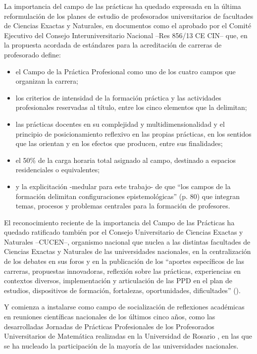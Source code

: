 \documentclass[oneside,spanish]{amsart}
\numberwithin{equation}{section}
\numberwithin{figure}{section}
\theoremstyle{definition}
\begin{document}
La importancia del campo de las prácticas ha quedado expresada en la última reformulación de los planes de estudio de profesorados universitarios de facultades de Ciencias Exactas y Naturales, en documentos como el aprobado por el Comité Ejecutivo del Consejo Interuniversitario Nacional --Res 856/13 CE CIN-- que, en la propuesta acordada de estándares para la acreditación de carreras de profesorado define: 
\begin{itemize}
	\item el Campo de la Práctica Profesional como uno de los cuatro campos que organizan la carrera;
	\item los criterios de intensidad de la formación práctica y las actividades profesionales reservadas al título, entre los cinco elementos que la delimitan;
	\item las prácticas docentes en su complejidad y multidimensionalidad y el principio de posicionamiento reflexivo en las propias prácticas, en los sentidos que las orientan y en los efectos que producen, entre sus finalidades;
	\item el 50\% de la carga horaria total asignado al campo, destinado a espacios residenciales o equivalentes;
	\item y la explicitación -medular para este trabajo- de que “los campos de la formación delimitan configuraciones epistemológicas” (p. 80) que integran temas, procesos y problemas centrales para la formación de profesores.
\end{itemize}

El reconocimiento reciente de la importancia del Campo de las Prácticas ha quedado ratificado también por el Consejo Universitario de Ciencias Exactas y Naturales --CUCEN--, organismo nacional que nuclea a las distintas facultades de Ciencias Exactas y Naturales de las universidades nacionales, en la centralización de los debates en sus foros y en la publicación de los “aportes específicos de las carreras, propuestas innovadoras, reflexión sobre las prácticas, experiencias en contextos diversos, implementación y articulación de las PPD  en el plan de estudios, dispositivos de formación, fortalezas, oportunidades, dificultades” (\cite{cucen18}).

Y comienza a instalarse como campo de socialización de reflexiones académicas en reuniones científicas nacionales de los últimos cinco años, como las desarrolladas Jornadas de Prácticas Profesionales de los Profesorados Universitarios de Matemática realizadas en la Universidad de Rosario , en las que se ha nucleado la participación de la mayoría de las universidades nacionales.
\end{document}
